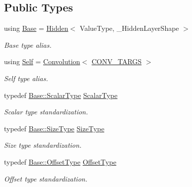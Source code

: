 \subsection*{Public Types}
\begin{DoxyCompactItemize}
\item 
using \hyperlink{classffnn_1_1layer_1_1_convolution_a6ad431ef10ff2e20cc1500b5765efe94}{Base} = \hyperlink{classffnn_1_1layer_1_1_hidden}{Hidden}$<$ Value\-Type, \-\_\-\-Hidden\-Layer\-Shape $>$
\begin{DoxyCompactList}\small\item\em Base type alias. \end{DoxyCompactList}\item 
using \hyperlink{classffnn_1_1layer_1_1_convolution_ae8b56bc2a6dbd4642a25210b1595f51c}{Self} = \hyperlink{classffnn_1_1layer_1_1_convolution}{Convolution}$<$ \hyperlink{convolution_8h_a30c3dcfd336a244f4421fe701352d1e4}{C\-O\-N\-V\-\_\-\-T\-A\-R\-G\-S} $>$
\begin{DoxyCompactList}\small\item\em Self type alias. \end{DoxyCompactList}\item 
typedef \hyperlink{classffnn_1_1layer_1_1internal_1_1_interface_a7f834e3365e5199bcbcd16d9abd63941}{Base\-::\-Scalar\-Type} \hyperlink{classffnn_1_1layer_1_1_convolution_a779ee450f39a97c1063d750416edb533}{Scalar\-Type}
\begin{DoxyCompactList}\small\item\em Scalar type standardization. \end{DoxyCompactList}\item 
typedef \hyperlink{classffnn_1_1layer_1_1_hidden_ac148012cb544a39841675601090cd4c8}{Base\-::\-Size\-Type} \hyperlink{classffnn_1_1layer_1_1_convolution_a9599a1f35642eb9b9f516659507ae58d}{Size\-Type}
\begin{DoxyCompactList}\small\item\em Size type standardization. \end{DoxyCompactList}\item 
typedef \hyperlink{classffnn_1_1layer_1_1_hidden_ae2409b970adafb0ebc9b2eec62c4aac4}{Base\-::\-Offset\-Type} \hyperlink{classffnn_1_1layer_1_1_convolution_a0ec0f3a4598c7286815f2fdd1e57e8ca}{Offset\-Type}
\begin{DoxyCompactList}\small\item\em Offset type standardization. \end{DoxyCompactList}\item 

\end{DoxyCompactItemize}
